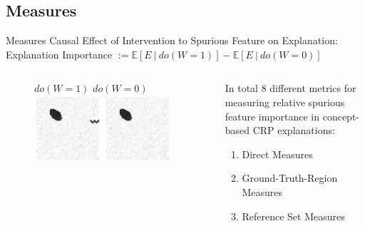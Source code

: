 \documentclass[German, aspectratio=169]{beamer}
\begin{document}
\subsection{Measures}
\begin{frame}[t]{Measures}
    Causal Effect of Intervention to Spurious Feature on Explanation: \\

    Explanation Importance $:= \mathbb{E} [ E \ | \ do(W=1) ]- \mathbb{E} [ E \ | \ do(W=0) ]$\\
    \vspace{0.5cm}
    \begin{columns}[t]
        \begin{column}[t]{.3\textwidth}
            \vspace{-0.5cm}
            \begin{figure}[t]
                $do(W=1)$ \hspace{0.13cm} $do(W=0)$
                \includegraphics[width=0.45\textwidth]{images/example_image.png}
                \includegraphics[width=0.45\textwidth]{images/example_image_false.png}
                \label{fig:example_image}
            \end{figure}
        \end{column}
        \begin{column}{.7\textwidth}
            In total 8 different metrics for measuring relative spurious feature importance in concept-based CRP explanations:
            \begin{enumerate}
                \item Direct Measures
                \item Ground-Truth-Region Measures
                \item Reference Set Measures
            \end{enumerate}
        \end{column}
    \end{columns}

\end{frame}
\end{document}
